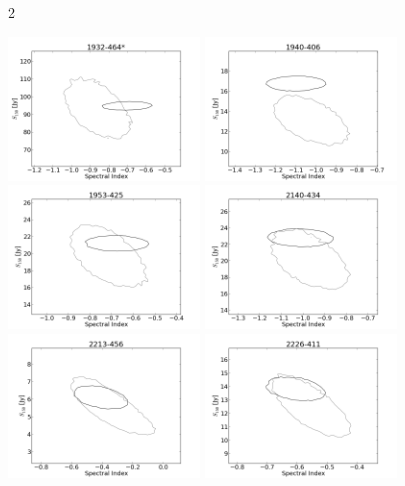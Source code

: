 \documentclass[preprint]{aastex}
\begin{document}
\clearpage
\begin{figure}[htbp]2\begin{center}
\includegraphics[width=2in]{plots/1932-464_SI_MCMC.png} %
\includegraphics[width=2in]{plots/1940-406_SI_MCMC.png} %
\includegraphics[width=2in]{plots/1953-425_SI_MCMC.png} %
\includegraphics[width=2in]{plots/2140-434_SI_MCMC.png} %
\includegraphics[width=2in]{plots/2213-456_SI_MCMC.png} %
\includegraphics[width=2in]{plots/2226-411_SI_MCMC.png} %

\end{center}
\end{figure}
\end{document}
